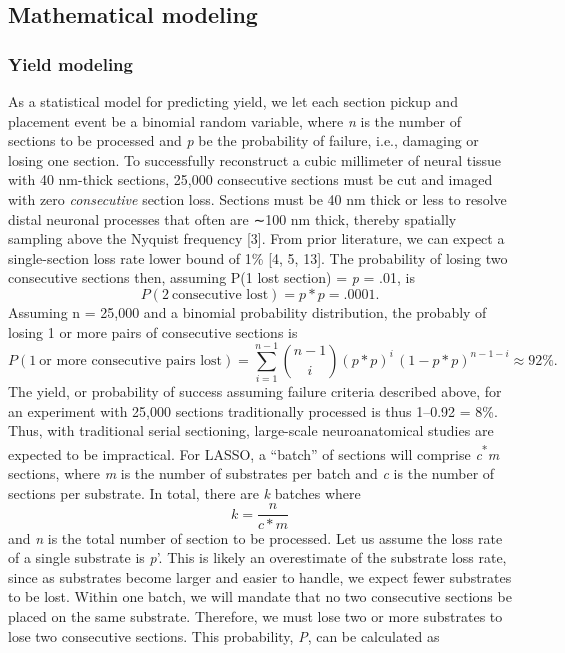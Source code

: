 \documentclass{article}
\begin{document}
\subsection*{Mathematical modeling}
\subsubsection*{Yield modeling}

As a statistical model for predicting yield, we let each section pickup and placement event be a binomial random variable, where \emph{n} is the number of sections to be processed and \emph{p} be the probability of failure, i.e., damaging or losing one section. To successfully reconstruct a cubic millimeter of neural tissue with 40 nm-thick sections, 25,000 consecutive sections must be cut and imaged with zero \emph{consecutive} section loss. Sections must be 40 nm thick or less to resolve distal neuronal processes that often are ∼100 nm thick, thereby spatially sampling above the Nyquist frequency [3]. From prior literature, we can expect a single-section loss rate lower bound of 1\% [4, 5, 13]. The probability of losing two consecutive sections then, assuming P(1 lost section) = \emph{p} = .01, is
\[ P(2\ \text{consecutive lost}) = p \ast p = .0001. \]
Assuming n = 25,000 and a binomial probability distribution, the probably of losing 1 or more pairs of consecutive sections is
\[ P(1\ \text{or more consecutive pairs lost}) = \textstyle\sum_{i=1}^{n-1} \displaystyle\binom{n-1}{i} (p \ast p)^{i} \, (1 - p \ast p)^{n-1-i} \approx 92\%. \]
The yield, or probability of success assuming failure criteria described above, for an experiment with 25,000 sections traditionally processed is thus 1–0.92 = 8\%. Thus, with traditional serial sectioning, large-scale neuroanatomical studies are expected to be impractical. For LASSO, a “batch” of sections will comprise \emph{c}\textsuperscript{*}\emph{m} sections, where \emph{m} is the number of substrates per batch and \emph{c} is the number of sections per substrate. In total, there are \emph{k} batches where
\begin{equation*} k = \frac{n}{c \ast m} \tag{1} \end{equation*}
and \emph{n} is the total number of section to be processed. Let us assume the loss rate of a single substrate is \emph{p}’. This is likely an overestimate of the substrate loss rate, since as substrates become larger and easier to handle, we expect fewer substrates to be lost. Within one batch, we will mandate that no two consecutive sections be placed on the same substrate. Therefore, we must lose two or more substrates to lose two consecutive sections. This probability, \emph{P}, can be calculated as
\end{document}
